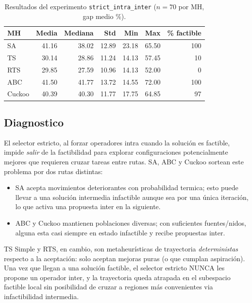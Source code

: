 \documentclass[11pt,a4paper]{article}
\theoremstyle{definition}
\theoremstyle{remark}
\begin{document}
\begin{table}[h]
\centering
\caption{Resultados del experimento \texttt{strict\_intra\_inter}
($n = 70$ por MH, gap medio \%).}
\label{tab:strict-resultados}
\small
\begin{tabular}{lrrrrrr}
\toprule
MH & Media & Mediana & Std & Min & Max & \% factible \\
\midrule
SA      & 41.16 & 38.02 & 12.89 & 23.18 & 65.50 & 100 \\
TS      & 30.14 & 28.86 & 11.24 & 14.13 & 57.45 &  10 \\
RTS     & 29.85 & 27.59 & 10.96 & 14.13 & 52.00 &   0 \\
ABC     & 41.50 & 41.77 & 13.72 & 14.55 & 72.00 & 100 \\
Cuckoo  & 40.39 & 40.30 & 11.77 & 17.75 & 64.85 &  97 \\
\bottomrule
\end{tabular}
\end{table}

\subsection{Diagnostico}

El selector estricto, al forzar operadores intra cuando la solución es
factible, impide \emph{salir} de la factibilidad para explorar
configuraciones potencialmente mejores que requieren cruzar tareas
entre rutas. SA, ABC y Cuckoo sortean este problema por dos rutas
distintas:

\begin{itemize}
\item SA acepta movimientos deteriorantes con probabilidad termica;
  esto puede llevar a una solución intermedia infactible aunque sea
  por una única iteración, lo que activa una propuesta inter en la
  siguiente.
\item ABC y Cuckoo mantienen poblaciones diversas; con suficientes
  fuentes/nidos, alguna esta casi siempre en estado infactible y
  recibe propuestas inter.
\end{itemize}

TS Simple y RTS, en cambio, son metaheurísticas de trayectoria
\emph{deterministas} respecto a la aceptación: solo aceptan mejoras
puras (o que cumplan aspiración). Una vez que llegan a una solución
factible, el selector estricto NUNCA les propone un operador inter, y
la trayectoria queda atrapada en el subespacio factible local sin
posibilidad de cruzar a regiones más convenientes via infactibilidad
intermedia.
\end{document}
